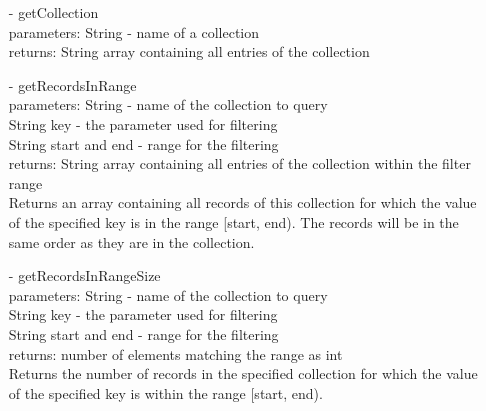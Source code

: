 \documentclass[oneside, english, final]{design}
\begin{document}
\begin{itemize}
\begin{itemize}
		      \item[-]getCollection
		            \\parameters: String - name of a collection
		            \\returns: String array containing all entries of the collection

		      \item[-]getRecordsInRange
		            \\parameters: String - name of the collection to query
		            \\String key - the parameter used for filtering
		            \\String start and end - range for the filtering
		            \\returns: String array containing all entries of the collection within the filter range
		            \\ Returns an array containing all records of this
		            collection for which the value of the
		            specified key is in the range [start, end).
		            The records will be in the same order as
		            they are in the collection.

		      \item[-]getRecordsInRangeSize
		            \\parameters: String - name of the collection to query
		            \\String key - the parameter used for filtering
		            \\String start and end - range for the filtering
		            \\returns: number of elements matching the range as int
		            \\Returns the number of records in the specified
		            collection for which the value of the specified
		            key is within the range [start, end).

	      \end{itemize}

	      \newpage


\end{itemize}
\end{document}
